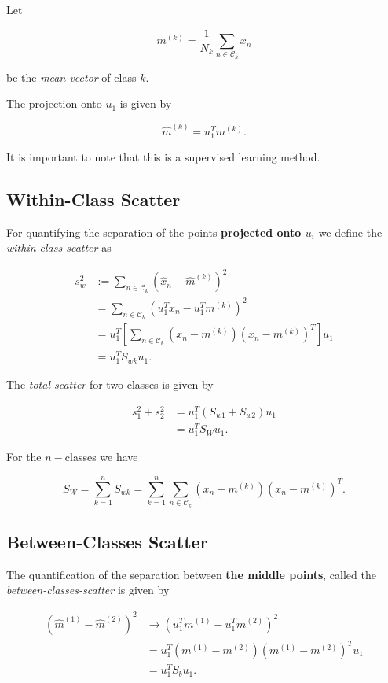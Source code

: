 Let

\[
	m^{(k)} = \frac{1}{N_k} \sum_{n \in \mathcal{C}_k} x_n
\]

be the \emph{mean vector} of class \(k\).

The projection onto \(u_1\) is given by

\[
	\hat{m}^{(k)} = u_1^T m^{(k)}.
\]

It is important to note that this is a supervised learning method.

\subsection{Within-Class Scatter}

For quantifying the separation of the points \textbf{projected onto \(u_i\)} we define
the \emph{within-class scatter} as

\begin{align*}
	s_w^2 & := \sum_{n \in \mathcal{C}_k} (\hat{x}_n - \hat{m}^{(k)})^2                            \\
	      & = \sum_{n \in \mathcal{C}_k} (u_1^T x_n - u_1^T m^{(k)})^2                             \\
	      & = u_1^T \left[ \sum_{n \in \mathcal{C}_k} (x_n - m^{(k)})(x_n - m^{(k)})^T \right] u_1 \\
	      & = u_1^T S_{wk} u_1.
\end{align*}

The \emph{total scatter} for two classes is given by

\begin{align*}
	s_1^2 + s_2^2 & = u_1^T (S_{w1} + S_{w2}) u_1 \\
	              & = u_1^T S_W u_1.
\end{align*}

For the \(n-\)classes we have

\[
	S_W = \sum_{k = 1}^{n} S_{wk} = \sum_{k = 1}^{n} \sum_{n \in \mathcal{C}_k} (x_n - m^{(k)})(x_n - m^{(k)})^T.
\]

\subsection{Between-Classes Scatter}

The quantification of the separation between \textbf{the middle points}, called the
\emph{between-classes-scatter} is given by

\begin{align*}
	(\hat{m}^{(1)} - \hat{m}^{(2)})^2 & \to (u_1^T m^{(1)} - u_1^T m^{(2)})^2                  \\
	                                  & = u_1^T (m^{(1)} - m^{(2)})(m^{(1)} - m^{(2)})^T u_1 \\
	                                  & = u_1^T S_b u_1.
\end{align*}

